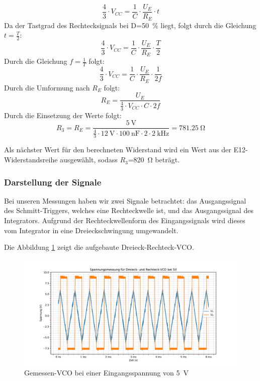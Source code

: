 \begin{equation*}
\frac{4}{3} \cdot V_{CC} = \frac{1}{C} \cdot \frac{U_E}{R_E} \cdot t
\end{equation*}
Da der Tastgrad des Rechtecksignals bei D=\SI{50}{\percent} liegt, folgt durch die Gleichung $t=\frac{T}{2}$:
\begin{equation*}
    \frac{4}{3}\cdot V_{CC}=\frac{1}{C}\cdot \frac{U_E}{R_E} \cdot \frac{T}{2}
\end{equation*}
Durch die Gleichung $f=\frac{1}{T}$ folgt:
\begin{equation*}
    \frac{4}{3}\cdot V_{CC}=\frac{1}{C}\cdot \frac{U_E}{R_E} \cdot \frac{1}{2f}
\end{equation*}
Durch die Umformung nach $R_E$ folgt:
\begin{equation*}
  R_E=\frac{U_E}{\frac{4}{3}\cdot V_{CC} \cdot C \cdot 2f}
\end{equation*}
Durch die Einsetzung der Werte folgt:
\begin{equation*}
 R_3=R_E=\frac{\SI{5}{\volt}}{\frac{4}{3}\cdot \SI{12}{\volt} \cdot \SI{100}{\nano\farad} \cdot 2 \cdot \SI{2}{\kilo\hertz}}=\SI{781,25}{\ohm}
\end{equation*}


Als nächster Wert für den berechneten Widerstand wird ein Wert aus der E12-Widerstandsreihe ausgewählt, sodass $R_3$=\SI{820}{\ohm} beträgt. 


\subsubsection{Darstellung der Signale}
Bei unseren Messungen haben wir zwei Signale betrachtet: das Ausgangssignal des Schmitt-Triggers, welches eine Rechteckwelle ist, und das Ausgangssignal des Integrators. Aufgrund der Rechteckwellenform des Eingangssignals wird dieses vom Integrator in eine Dreieckschwingung umgewandelt. 

Die Abbildung \ref{fig:VCO_5Volt} zeigt die aufgebaute Dreieck-Rechteck-VCO.

\begin{figure}[H]
  \centering
  \includegraphics[width=0.8\linewidth]{Elektronik-Laborprotokoll_PLL/Plots/VCO_5V.pdf}
  \caption{Gemessen-VCO bei einer Eingangsspannung von \SI{5}{\volt}}
  \label{fig:VCO_5Volt}
\end{figure}

